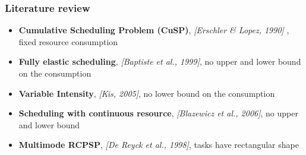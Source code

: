 \begin{frame}
  \frametitle{Literature review}
  \begin{itemize}
    \vfill
  \item {\bf Cumulative Scheduling Problem (CuSP)}, {\color{gray!50!black!50} \it [Erschler \& Lopez, 1990] },{\color{blue!80!black!80} fixed resource consumption}
    \vfill
  \item {\bf Fully elastic scheduling}, {\color{gray!50!black!50} \it [Baptiste et al., 1999]}, {\color{blue!80!black!80} no upper and lower bound on the consumption}
    \vfill
  \item {\bf Variable Intensity}, {\color{gray!50!black!50} \it [Kis, 2005]}, {\color{blue!80!black!80} no lower bound on the consumption}
    \vfill  
  \item {\bf Scheduling with continuous resource}, {\color{gray!50!black!50}\it [Blazewicz et al., 2006]}, {\color{blue!80!black!80}  no upper and lower bound}
    \vfill
  \item {\bf Multimode RCPSP}, {\color{gray!50!black!50}\it [De Reyck
      et al., 1998]},
    {\color{blue!80!black!80} tasks have rectangular shape}
  \end{itemize}
  \vfill
\end{frame}


